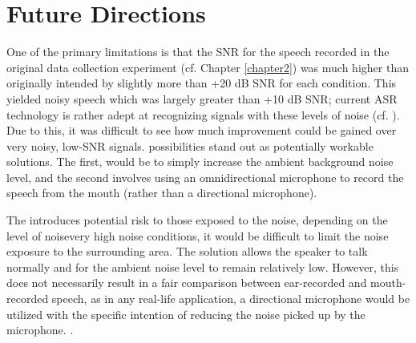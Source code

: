 \DIFaddend \section{Future Directions}\label{chap5:future-research}

One of the primary limitations \DIFdelbegin {}\DIFdelend is that the SNR for the speech recorded in the original data collection experiment (cf. Chapter \ref{chapter2}) was much higher than originally intended \DIFdelbegin {}\DIFdelend by slightly more than +20 dB SNR for each condition.  This yielded noisy speech which was largely greater than +10 dB SNR; current ASR technology is rather adept at recognizing signals with these levels of noise (cf. \cite{braun:16}).  Due to this, it was difficult to see how much improvement could be gained over very noisy, low-SNR signals.  \DIFdelbegin {}\DIFdelend \DIFaddbegin {}\DIFaddend possibilities stand out as potentially workable solutions.  The first, would be to simply increase the ambient background noise level, and the second involves using an omnidirectional microphone to record the speech from the mouth (rather than a directional microphone).  \DIFaddbegin {}\DIFaddend 

The \DIFdelbegin {}\DIFdelend \DIFaddbegin {}\DIFaddend introduces potential risk to those exposed to the noise, depending on the level of noise\DIFdelbegin {}\DIFdelend \DIFaddbegin {}\DIFaddend very high noise conditions, it would be difficult to limit the noise exposure to the surrounding area.  The \DIFdelbegin {}\DIFdelend \DIFaddbegin {}\DIFaddend solution allows the speaker to talk normally and for the ambient noise level to remain relatively low.  However, this does not necessarily result in a fair comparison between ear-recorded and mouth-recorded speech, as in any real-life application, a directional microphone would be utilized with the specific intention of reducing the noise picked up by the microphone.  \DIFdelbegin {}\DIFdelend %
\DIFaddbegin {}\DIFaddend .

